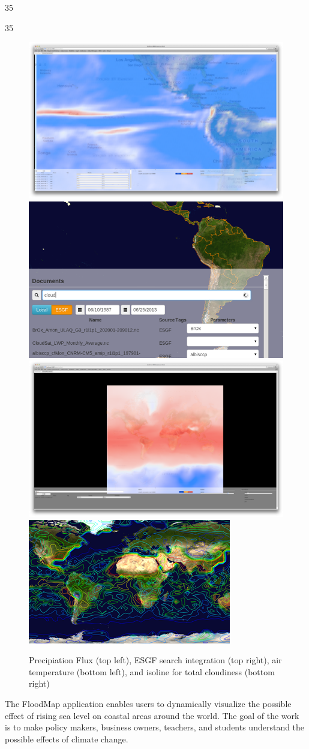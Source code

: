 \documentclass[a0,landscape]{a0poster}
\newenvironment{pcol}[1]{
  \begin{minipage}[t]{#1}
}{
  \end{minipage}
}
\begin{document}
\begin{textblock}{35}
\begin{pcol}{\threecolwidth}
\begin{textblock}{35}
\begin{pcol}{35cm}
\begin{figure}[montage]
  \vspace{0.7cm}
  \includegraphics[height=0.2\hsize]{images/PrecipiationFlux}
  \hspace{0.3cm}
  \includegraphics[height=0.2\hsize]{images/DataIntegrationImage}
  \\
  \vspace{0.7cm}
  \includegraphics[height=0.2\hsize]{images/AirTemp}
  \hspace{0.3cm}
  \includegraphics[height=0.2\hsize]{images/IsolineImage}
  \caption{Precipiation Flux (top left), ESGF search integration (top right), air temperature (bottom left), and isoline for total cloudiness (bottom right)}
  \nobreak
\end{figure}




The FloodMap application enables users to dynamically visualize the possible effect of rising sea level on coastal areas around the world. The goal of the work is to make policy
makers, business owners, teachers, and students understand the possible effects of climate change.


\end{pcol}
\end{textblock}
\end{pcol}
\end{textblock}
\end{document}
